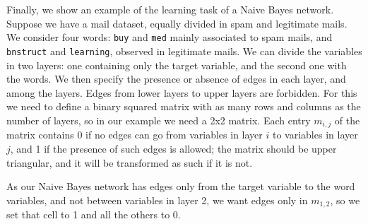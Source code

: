 \documentclass{article}\usepackage[]{graphicx}\usepackage[]{color}
\begin{document}
Finally, we show an example of the learning task of a Naive Bayes network. Suppose we have a mail dataset, equally divided in spam and legitimate mails.
We consider four words: \texttt{buy} and \texttt{med} mainly associated to spam mails, and \texttt{bnstruct} and \texttt{learning}, observed in legitimate mails.
We can divide the variables in two layers: one containing only the target variable, and the second one with the words.
We then specify the presence or absence of edges in each layer, and among the layers. Edges from lower layers to upper layers are forbidden.
For this we need to define a binary squared matrix with as many rows and columns as the number of layers, so in our example we need a 2x2 matrix.
Each entry $m_{i,j}$ of the matrix contains 0 if no edges can go from variables in layer $i$ to variables in layer $j$, and 1 if the presence of such edges is allowed;
the matrix should be upper triangular, and it will be transformed as such if it is not.

As our Naive Bayes network has edges only from the target variable to the word variables, and not between variables in layer 2, we want edges only
in $m_{1,2}$, so we set that cell to 1 and all the others to 0.
\end{document}
